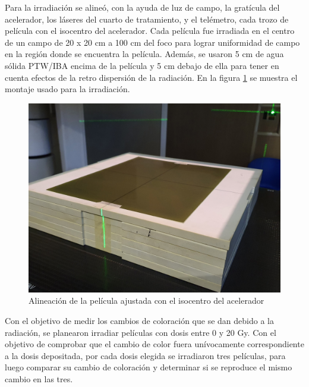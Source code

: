 Para la irradiación se alineó, con la ayuda de luz de campo, la gratícula del acelerador, los láseres del cuarto de tratamiento, y el telémetro, cada trozo de película con el isocentro del acelerador. Cada película fue irradiada en el centro de un campo de 20 x 20 cm a 100 cm del foco para lograr uniformidad de campo en la región donde se encuentra la película. Además, se usaron 5 cm de agua sólida PTW/IBA encima de la película y 5 cm debajo de ella para tener en cuenta efectos de la retro dispersión de la radiación. En la figura  \ref{fig:MontajePelicula} se muestra el montaje usado para la irradiación.\\
\begin{figure}
	\centering
	\includegraphics[width=0.7\linewidth]{images/alineacionCampo.jpg}
	\caption{Alineación de la película ajustada con el isocentro del acelerador}
	\label{fig:MontajePelicula}
\end{figure}

Con el objetivo de medir los cambios de coloración que se dan debido a la radiación, se planearon irradiar películas con dosis entre 0 y 20 Gy. Con el objetivo de comprobar que el cambio de color fuera unívocamente correspondiente a la dosis depositada, por cada dosis elegida se irradiaron tres películas, para luego comparar su cambio de coloración y determinar si se reproduce el mismo cambio en las tres.\\ 


